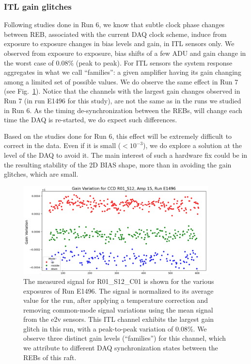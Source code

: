 \subsubsection{ITL gain glitches}
Following studies done in Run 6, we know that subtle clock phase changes between REB, associated with the current DAQ clock scheme, induce from exposure to exposure changes in bias levels and gain, in ITL sensors only.  We observed from exposure to exposure, bias shifts of a few ADU and gain change in the worst case of 0.08\% (peak to peak). For ITL sensors the system response aggregates in what we call ``families'': a given amplifier having its gain changing among a limited set of possible values. We do observe the same effect in Run 7 (see Fig.~\ref{fig:ITLGglitch}). Notice that the channels with the largest gain changes observed in Run 7 (in run E1496 for this study), are  not the same as in the runs we studied in Run 6. As the timing de-synchronization between the REBs, will change each time the DAQ is re-started, we do expect such differences.

Based on the studies done for Run 6, this effect will be extremely difficult to correct in the data. Even if it is small ($<10^{-3}$), we do explore a solution at the level of the DAQ to avoid it. The main interest of such a hardware fix could be in the resulting  stability of the 2D BIAS shape, more than in avoiding the gain glitches, which are small.

\begin{figure}[ht]
\begin{centering}
\includegraphics[width=0.9\textwidth]{figures/Gain_variation_R01_S12_amp15_E1496.png}
\end{centering}
\caption{The measured signal for R01\_S12\_C01 is shown for the various exposures of Run E1496. The signal is normalized to its average value for the run, after applying a temperature correction and removing common-mode signal variations using the mean signal from the e2v sensors. This ITL channel exhibits the largest gain glitch in this run, with a peak-to-peak variation of 0.08\%. We observe three distinct gain levels (``families'') for this channel, which we attribute to different DAQ synchronization states between the REBs of this raft.}
\label{fig:ITLGglitch}
\end{figure}

